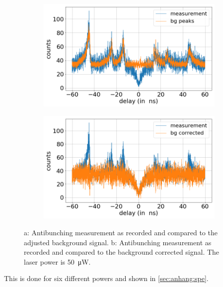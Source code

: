 \begin{figure}[H]
    \centering
    \begin{subfigure}{0.7\textwidth}
        \centering
        \includegraphics[width=1.0\textwidth]{img/output_t2/50.0muW_bg_peaks.png}
    \caption{}
    \label{fig_antibunch_background_comp}
    \end{subfigure}
    \begin{subfigure}{0.7\textwidth}
        \centering
        \includegraphics[width=\textwidth]{img/output_t2/50.0muW_bg_vgl.png}
        \caption{}
        \label{fig_antibunch_raw_corr_comp}
    \end{subfigure}
    \caption{a: Antibunching measurement as recorded and compared to the adjusted background signal. b: Antibunching measurement as recorded and compared to the background corrected signal. The laser power is \SI{50}{\micro W}.}
	\label{fig_antibunch_comp}
\end{figure}

This is done for six different powers and shown in \cref{sec:anhang:spe}.

